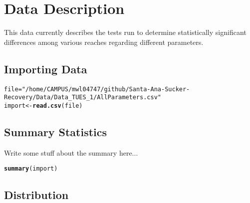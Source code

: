 \documentclass{article}\usepackage[]{graphicx}\usepackage[]{color}
\makeatletter
\newcommand{\hlstr}[1]{\textcolor[rgb]{0.192,0.494,0.8}{#1}}%
\newcommand{\hlstd}[1]{\textcolor[rgb]{0.345,0.345,0.345}{#1}}%
\newcommand{\hlkwb}[1]{\textcolor[rgb]{0.69,0.353,0.396}{#1}}%
\newcommand{\hlkwd}[1]{\textcolor[rgb]{0.737,0.353,0.396}{\textbf{#1}}}%
\newenvironment{kframe}{%
 \def\at@end@of@kframe{}%
 \ifinner\ifhmode%
  \def\at@end@of@kframe{\end{minipage}}%
  \begin{minipage}{\columnwidth}%
 \fi\fi%
 \def\FrameCommand##1{\hskip\@totalleftmargin \hskip-\fboxsep
 \colorbox{shadecolor}{##1}\hskip-\fboxsep
     \hskip-\linewidth \hskip-\@totalleftmargin \hskip\columnwidth}%
 \MakeFramed {\advance\hsize-\width
   \@totalleftmargin\z@ \linewidth\hsize
   \@setminipage}}%
 {\par\unskip\endMakeFramed%
 \at@end@of@kframe}
\newenvironment{knitrout}{}{} %
\makeatother
\begin{document}
\section{Data Description}

This data currently describes the tests run to determine statistically significant differences among various reaches regarding different parameters. 

\subsection{Importing Data}


\begin{knitrout}
\color{fgcolor}\begin{kframe}
\begin{alltt}
\hlstd{file} \hlkwb{=} \hlstr{"/home/CAMPUS/mwl04747/github/Santa-Ana-Sucker-Recovery/Data/Data_TUES_1/AllParameters.csv"}
\hlstd{import} \hlkwb{<-} \hlkwd{read.csv}\hlstd{(file)}
\end{alltt}


{\ttfamily\noindent{}}

{\ttfamily\noindent\bfseries{}}\end{kframe}
\end{knitrout}


\subsection{Summary Statistics}

Write some stuff about the summary here...
\begin{knitrout}
\color{fgcolor}\begin{kframe}
\begin{alltt}
\hlkwd{summary}\hlstd{(import)}
\end{alltt}


{\ttfamily\noindent\bfseries\color{errorcolor}{\#\# Error in summary(import): object 'import' not found}}\end{kframe}
\end{knitrout}

\subsection{Distribution}
\end{document}
